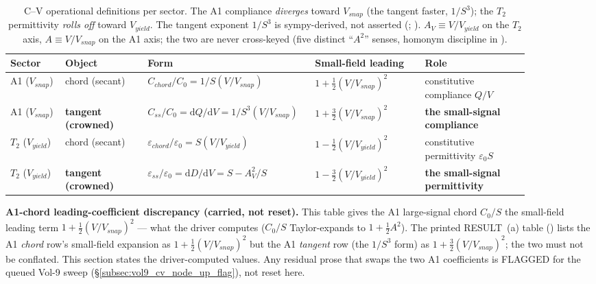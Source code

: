 \begin{table}[htbp]
\centering\footnotesize
\setlength{\tabcolsep}{4pt}
\begin{tabular}{@{}p{0.10\linewidth} p{0.15\linewidth} p{0.24\linewidth} p{0.20\linewidth} p{0.19\linewidth}@{}}
\toprule
\textbf{Sector} & \textbf{Object} & \textbf{Form} & \textbf{Small-field leading} & \textbf{Role} \\
\midrule
A1 ($V_{snap}$) & chord (secant) & $C_{chord}/C_0 = 1/S(V/V_{snap})$ & $1 + \tfrac12(V/V_{snap})^2$ & constitutive compliance $Q/V$ \\
A1 ($V_{snap}$) & \textbf{tangent (crowned)} & $C_{ss}/C_0 = \mathrm{d}Q/\mathrm{d}V = 1/S^3(V/V_{snap})$ & $1 + \tfrac32(V/V_{snap})^2$ & \textbf{the small-signal compliance} \\
$T_2$ ($V_{yield}$) & chord (secant) & $\varepsilon_{chord}/\varepsilon_0 = S(V/V_{yield})$ & $1 - \tfrac12(V/V_{yield})^2$ & constitutive permittivity $\varepsilon_0 S$ \\
$T_2$ ($V_{yield}$) & \textbf{tangent (crowned)} & $\varepsilon_{ss}/\varepsilon_0 = \mathrm{d}D/\mathrm{d}V = S - A_V^2/S$ & $1 - \tfrac32(V/V_{yield})^2$ & \textbf{the small-signal permittivity} \\
\bottomrule
\end{tabular}
\caption{C--V operational definitions per sector. The A1 compliance
\emph{diverges} toward $V_{snap}$ (the tangent faster, $1/S^3$); the $T_2$
permittivity \emph{rolls off} toward $V_{yield}$. The tangent exponent $1/S^3$ is
sympy-derived, not asserted
(;
).
$A_V \equiv V/V_{yield}$ on the $T_2$ axis, $A \equiv V/V_{snap}$ on the A1 axis;
the two are never cross-keyed (five distinct ``$A^2$'' senses, homonym discipline
in ).}
\label{tab:vol9_cv_operational_definitions}
\end{table}

\noindent\textbf{A1-chord leading-coefficient discrepancy (carried, not reset).}
This table gives the A1 large-signal chord $C_0/S$ the small-field leading term
$1 + \tfrac12(V/V_{snap})^2$ --- what the driver
computes ($C_0/S$ Taylor-expands to $1 + \tfrac12 A^2$). The printed RESULT~(a)
table
() lists the A1
\emph{chord} row's small-field expansion as $1 + \tfrac12(V/V_{snap})^2$ but the
A1 \emph{tangent} row (the $1/S^3$ form) as $1 + \tfrac32(V/V_{snap})^2$; the two
must not be conflated. This section states the driver-computed values. Any
residual prose that swaps the two A1 coefficients is FLAGGED for the queued Vol-9
sweep (\S\ref{subsec:vol9_cv_node_up_flag}), not reset here.

